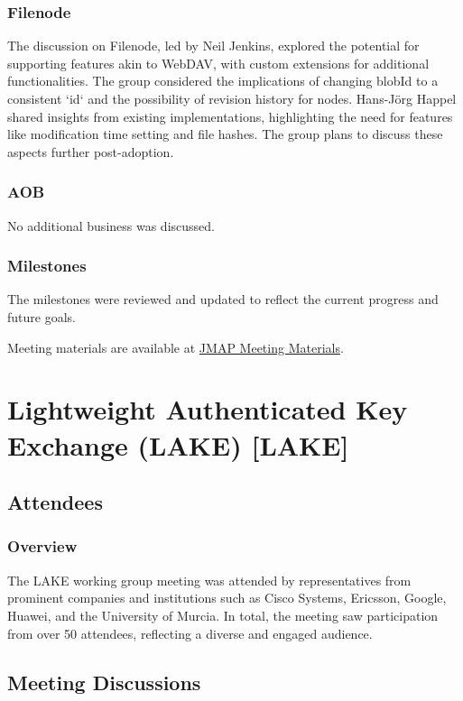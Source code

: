 \documentclass{article}
\begin{document}
\subsubsection{Filenode}
The discussion on Filenode, led by Neil Jenkins, explored the potential for supporting features akin to WebDAV, with custom extensions for additional functionalities. The group considered the implications of changing blobId to a consistent `id` and the possibility of revision history for nodes. Hans-Jörg Happel shared insights from existing implementations, highlighting the need for features like modification time setting and file hashes. The group plans to discuss these aspects further post-adoption.

\subsubsection{AOB}
No additional business was discussed.

\subsubsection{Milestones}
The milestones were reviewed and updated to reflect the current progress and future goals.

Meeting materials are available at \href{https://example.com/jmap-meeting-materials}{JMAP Meeting Materials}.



\newpage

\section{Lightweight Authenticated Key Exchange (LAKE) [LAKE]}

\subsection{Attendees}
\subsubsection{Overview}
The LAKE working group meeting was attended by representatives from prominent companies and institutions such as Cisco Systems, Ericsson, Google, Huawei, and the University of Murcia. In total, the meeting saw participation from over 50 attendees, reflecting a diverse and engaged audience.

\subsection{Meeting Discussions}
\end{document}
